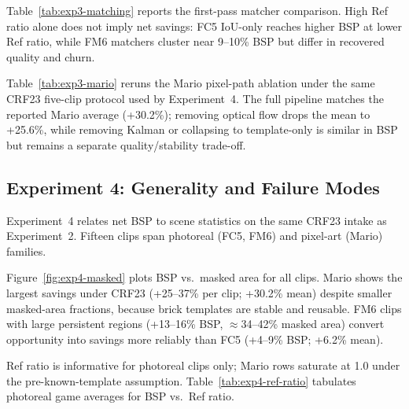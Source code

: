Table~\ref{tab:exp3-matching} reports the first-pass matcher comparison.
High Ref ratio alone does not imply net savings: FC5 IoU-only reaches higher BSP at lower Ref ratio, while FM6 matchers cluster near 9--10\% BSP but differ in recovered quality and churn.

\begin{table}[t]
  \centering
  \small
  \caption{Experiment~3: matching-strategy ablation. Ref ratio is useful, but churn and recovered quality determine whether reuse becomes a bandwidth win.}
  \label{tab:exp3-matching}
  \setlength{\tabcolsep}{4pt}
  
\end{table}

Table~\ref{tab:exp3-mario} reruns the Mario pixel-path ablation under the same CRF23 five-clip protocol used by Experiment~4.
The full pipeline matches the reported Mario average (+30.2\%); removing optical flow drops the mean to +25.6\%, while removing Kalman or collapsing to template-only is similar in BSP but remains a separate quality/stability trade-off.

\begin{table}[t]
  \centering
  \small
  \caption{Experiment~3: Mario pixel-path ablation under CRF23 five-clip intake. Values are means over \texttt{mario\_00}--\texttt{mario\_04}.}
  \label{tab:exp3-mario}
  \setlength{\tabcolsep}{4pt}
  
\end{table}

\subsection{Experiment 4: Generality and Failure Modes}
\label{sec:exp4}

Experiment~4 relates net BSP to scene statistics on the same CRF23 intake as Experiment~2.
Fifteen clips span photoreal (FC5, FM6) and pixel-art (Mario) families.

Figure~\ref{fig:exp4-masked} plots BSP vs.\ masked area for all clips.
Mario shows the largest savings under CRF23 (+25--37\% per clip; +30.2\% mean) despite smaller masked-area fractions, because brick templates are stable and reusable.
FM6 clips with large persistent regions (+13--16\% BSP, $\approx$34--42\% masked area) convert opportunity into savings more reliably than FC5 (+4--9\% BSP; +6.2\% mean).

Ref ratio is informative for photoreal clips only; Mario rows saturate at 1.0 under the pre-known-template assumption.
Table~\ref{tab:exp4-ref-ratio} tabulates photoreal game averages for BSP vs.\ Ref ratio.

